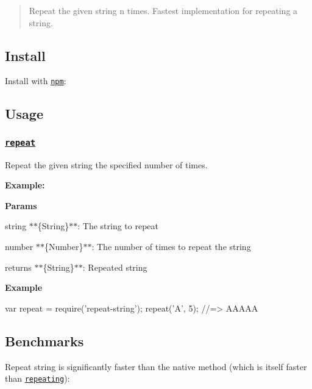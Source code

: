 \begin{quote}
Repeat the given string n times. Fastest implementation for repeating a string. \end{quote}


\subsection*{Install}

Install with \href{https://www.npmjs.com/}{\tt npm}\+:




\subsection*{Usage}

\subsubsection*{\href{index.js#L41}{\tt repeat}}

Repeat the given {\ttfamily string} the specified {\ttfamily number} of times.

{\bfseries Example\+:}

{\bfseries Params}


\begin{DoxyItemize}
\item {\ttfamily string} $\ast$$\ast$\{String\}$\ast$$\ast$\+: The string to repeat
\item {\ttfamily number} $\ast$$\ast$\{Number\}$\ast$$\ast$\+: The number of times to repeat the string
\item {\ttfamily returns} $\ast$$\ast$\{String\}$\ast$$\ast$\+: Repeated string
\end{DoxyItemize}

{\bfseries Example}


\begin{DoxyCode}
var repeat = require('repeat-string');
repeat('A', 5);
//=> AAAAA
\end{DoxyCode}


\subsection*{Benchmarks}

Repeat string is significantly faster than the native method (which is itself faster than \href{https://github.com/sindresorhus/repeating}{\tt repeating})\+:


